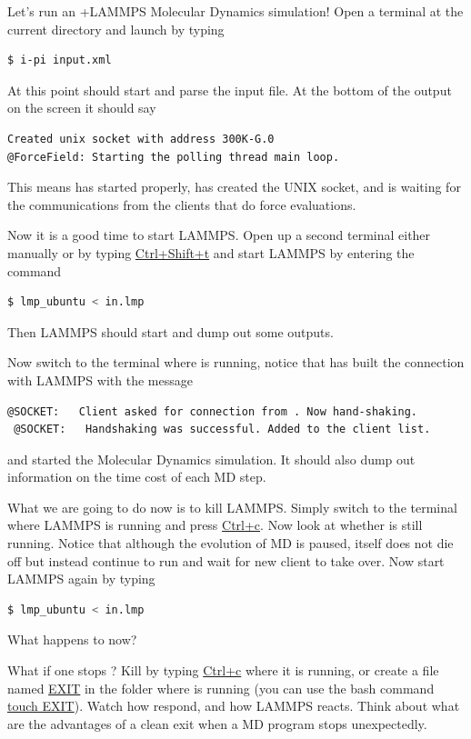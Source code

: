 \documentclass{article}
\begin{document}
\begin{Exercise}[label={basic},title={Molecular Dynamics simulations doing in a different way:  server and clients}]
\Question
Let's run an \ipi{}+LAMMPS Molecular Dynamics simulation!
Open a terminal at the current directory and
launch \ipi{} by typing
\begin{lstlisting}[language=bash]
$ i-pi input.xml
\end{lstlisting}
At this point \ipi{} should start 
and parse the input file. At the bottom of the output on the screen it should say
\begin{lstlisting}[language=bash]
Created unix socket with address 300K-G.0
@ForceField: Starting the polling thread main loop.
\end{lstlisting}
This means \ipi{} has started properly, has created the UNIX socket, and is waiting for the communications from the clients that do force evaluations.

\Question
Now it is a good time to start LAMMPS.
Open up a second terminal either manually or by typing \url{Ctrl+Shift+t}
and start LAMMPS by entering the command
\begin{lstlisting}[language=bash]
$ lmp_ubuntu < in.lmp
\end{lstlisting}
Then LAMMPS should start and dump out some outputs.

\Question
Now switch to the terminal where \ipi{} is running, notice that \ipi{} has built the connection with LAMMPS with the message
\begin{lstlisting}[language=sh]
 @SOCKET:   Client asked for connection from . Now hand-shaking.
 @SOCKET:   Handshaking was successful. Added to the client list.
\end{lstlisting}
and started the Molecular Dynamics simulation.
It should also dump out information on the time cost of each MD step.

\Question
What we are going to do now is to kill LAMMPS.
Simply switch to the terminal where LAMMPS is running and press \url{Ctrl+c}.
Now look at whether \ipi{} is still running.
Notice that although the evolution of MD is paused, \ipi{} itself does not die off but instead continue to run and wait for new client to take over.
Now start LAMMPS again by typing
\begin{lstlisting}[language=bash]
$ lmp_ubuntu < in.lmp
\end{lstlisting}
What happens to \ipi{} now?

\Question
What if one stops \ipi{}? 
Kill \ipi{} by typing \url{Ctrl+c} where it is running, or create a file named \url{EXIT} in the folder where \ipi{} is running
(you can use the bash command \url{touch EXIT}).
Watch how \ipi{} respond, and how LAMMPS reacts.
Think about what are the advantages of a clean exit when a MD program stops unexpectedly.


\end{Exercise}
\end{document}
